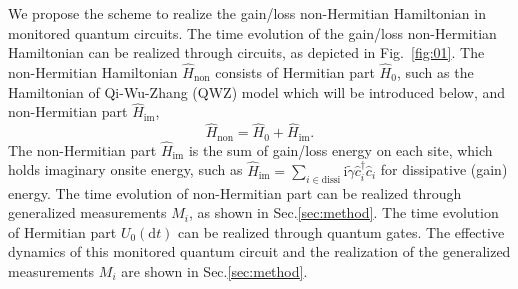 \documentclass[longbibliography, aps, prx, amsmath, amssymb, amsfonts, twocolumn,superscriptaddress, footinbib]{revtex4-1}
\begin{document}
	We propose the scheme to realize the gain/loss non-Hermitian Hamiltonian in monitored quantum circuits. The time evolution of the gain/loss non-Hermitian Hamiltonian can be realized through circuits, as depicted in Fig.~\ref{fig:01}. The non-Hermitian Hamiltonian $\hat{H}_{\text{non}}$ consists of Hermitian part $\hat{H}_0$, such as the Hamiltonian of Qi-Wu-Zhang (QWZ) model which will be introduced below, and non-Hermitian part $\hat{H}_{\text{im}}$,
	\begin{equation}
		\hat{H}_{\text{non}} = \hat{H}_0 +\hat{H}_{\text{im}}. \label{eq:non-hermitian}
	\end{equation}
	The non-Hermitian part $\hat{H}_{\text{im}}$ is the sum of gain/loss energy on each site, which holds imaginary onsite energy, such as $\hat{H}_{\text{im}} = \sum_{i\in \text{dissi}} \mathrm{i}\tilde{\gamma} \hat{c}_i^{\dagger} \hat{c}_i$ for dissipative (gain) energy. The time evolution of non-Hermitian part can be realized through generalized measurements $M_i$, as shown in Sec.\ref{sec:method}. The time evolution of Hermitian part $U_0(\mathrm{d}t)$ can be realized through quantum gates. The effective dynamics of this monitored quantum circuit and the realization of the generalized measurements $M_i$ are shown in Sec.\ref{sec:method}.



\end{document}
